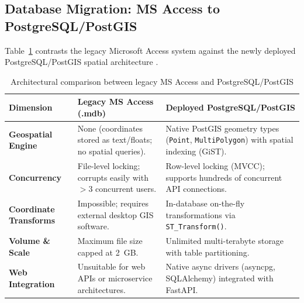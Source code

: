 \documentclass[12pt,a4paper]{report}
\begin{document}
\subsection{Database Migration: MS Access to PostgreSQL/PostGIS}
Table~\ref{tab:db_comparison} contrasts the legacy Microsoft Access system against the newly deployed PostgreSQL/PostGIS spatial architecture \cite{stonebraker2018, postgresql2024, postgis2024}.

\begin{table}[htbp]
\centering
\caption{Architectural comparison between legacy MS Access and PostgreSQL/PostGIS}
\label{tab:db_comparison}
\small
\begin{tabular}{p{3.5cm}p{5.5cm}p{5.5cm}}
\toprule
\textbf{Dimension} & \textbf{Legacy MS Access (.mdb)} & \textbf{Deployed PostgreSQL/PostGIS} \\
\midrule
\textbf{Geospatial Engine} & None (coordinates stored as text/floats; no spatial queries). & Native PostGIS geometry types (\texttt{Point}, \texttt{MultiPolygon}) with spatial indexing (GiST). \\
\textbf{Concurrency} & File-level locking; corrupts easily with $>3$ concurrent users. & Row-level locking (MVCC); supports hundreds of concurrent API connections. \\
\textbf{Coordinate Transforms} & Impossible; requires external desktop GIS software. & In-database on-the-fly transformations via \texttt{ST\_Transform()}. \\
\textbf{Volume \& Scale} & Maximum file size capped at 2~GB. & Unlimited multi-terabyte storage with table partitioning. \\
\textbf{Web Integration} & Unsuitable for web APIs or microservice architectures. & Native async drivers (asyncpg, SQLAlchemy) integrated with FastAPI. \\
\bottomrule
\end{tabular}
\end{table}
\end{document}
